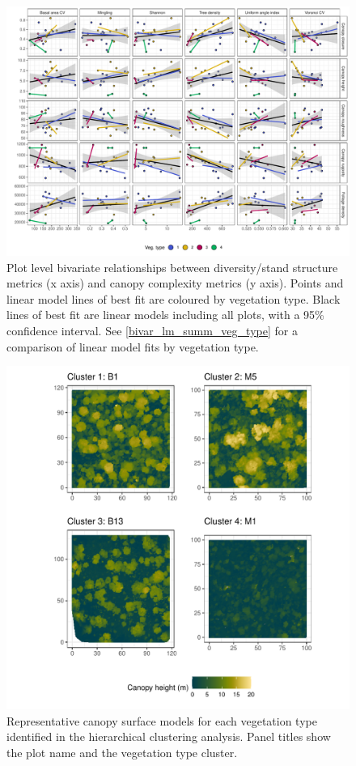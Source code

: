 \documentclass[11pt,a4paper]{article}
\begin{document}
\begin{landscape}
\begin{figure}
	\includegraphics[width=0.8\linewidth]{bivar_plot}
	\caption[Bivariate plots comparing diversity, stand structure and canopy complexity]{Plot level bivariate relationships between diversity/stand structure metrics (x axis) and canopy complexity metrics (y axis). Points and linear model lines of best fit are coloured by vegetation type. Black lines of best fit are linear models including all plots, with a 95\% confidence interval. See \autoref{bivar_lm_summ_veg_type} for a comparison of linear model fits by vegetation type.}
	\label{plot_bivar}
\end{figure}
\end{landscape}


\begin{figure}
	\includegraphics[width=\linewidth]{veg_type_tile}
	\caption{Representative canopy surface models for each vegetation type identified in the hierarchical clustering analysis. Panel titles show the plot name and the vegetation type cluster.}
	\label{veg_type_tile}
\end{figure}
\end{document}
